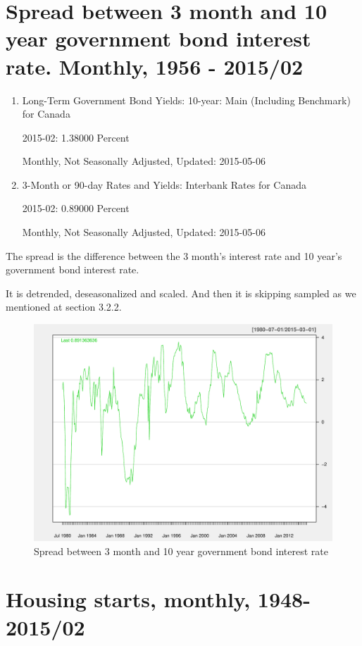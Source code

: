  
\section{Spread between 3 month and 10 year government bond interest rate. Monthly, 1956 - 2015/02} 
 
 
\begin{enumerate}
	\item{Long-Term Government Bond Yields: 10-year: Main (Including Benchmark) for Canada
		
		2015-02: 1.38000 Percent
		
		Monthly, Not Seasonally Adjusted, Updated: 2015-05-06}
	\item{3-Month or 90-day Rates and Yields: Interbank Rates for Canada
		
		2015-02: 0.89000 Percent 
		
		Monthly, Not Seasonally Adjusted, Updated: 2015-05-06}
\end{enumerate} 
 




The spread is the difference between the 3 month's interest rate and 10 year's government bond interest rate. 

 
It is detrended, deseasonalized and scaled. And then it is skipping sampled as we mentioned at section 3.2.2. 
 
 
\begin{figure}
\centering
\includegraphics[width=0.7\linewidth]{Figures/spread-report}
\caption{Spread between 3 month and 10 year government bond interest rate}
\label{fig:spread-report}
\end{figure}


\section{Housing starts, monthly, 1948-2015/02} 

